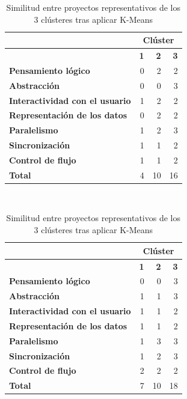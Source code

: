 \documentclass[a4paper, 12pt]{book}
\begin{document}
\begin{table}[H]
    \begin{subtable}[h]{0.49\textwidth}
        \centering
        \begin{tabular}{lrrr}
            {} & \multicolumn{3}{c}{\cellcolor[HTML]{FFCCC9}\textbf{Clúster}} \\ 
            \hline
            {} & \textbf{1} & \textbf{2} & \textbf{3} \\ 
            \hline
            \textbf{Pensamiento lógico} & 0 & 2 & 2 \\
            \textbf{Abstracción} & 0 & 0 & 3 \\
            \textbf{Interactividad con el usuario} & 1 & 2 & 2 \\
            \textbf{Representación de los datos} & 0 & 2 & 2 \\
            \textbf{Paralelismo} & 1 & 2 & 3 \\
            \textbf{Sincronización} & 1 & 1 & 2 \\
            \textbf{Control de flujo} & 1 & 1 & 2 \\ 
            \hline
            \textbf{Total} & 4 & 10 & 16 \\ 
            \hline
        \end{tabular}
        \caption{Dataset de 269842 proyectos}
        \label{table:prototype_269842}
    \end{subtable}
    ~
    \begin{subtable}[h]{0.49\textwidth}
        \centering
        \begin{tabular}{lrrr}
        {\color[HTML]{000000} {}} & \multicolumn{3}{c}{\cellcolor[HTML]{CBCEFB}\textbf{Clúster}} \\ 
            \hline
            {} & \textbf{1} & \textbf{2} & \textbf{3} \\ \hline
            \textbf{Pensamiento lógico} & 0 & 0 & 3 \\
            \textbf{Abstracción} & 1 & 1 & 3 \\
            \textbf{Interactividad con el usuario} & 1 & 1 & 2 \\
            \textbf{Representación de los datos} & 1 & 1 & 2 \\
            \textbf{Paralelismo} & 1 & 3 & 3 \\
            \textbf{Sincronización} & 1 & 2 & 3 \\
            \textbf{Control de flujo} & 2 & 2 & 2 \\ 
            \hline
            \textbf{Total} & 7 & 10 & 18 \\ 
            \hline
        \end{tabular}
        \caption{Muestra de 250 proyectos}
        \label{table:prototype_250}
    \end{subtable}
    \caption{Similitud entre proyectos representativos de los 3 clústeres tras aplicar K-Means}
\end{table}
\end{document}
